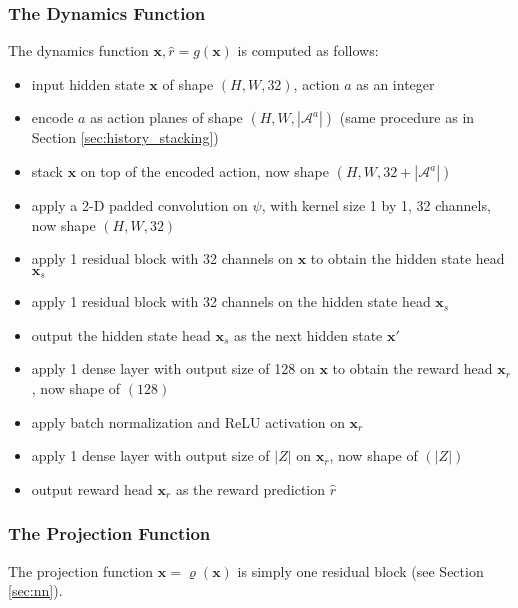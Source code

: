 \subsubsection{The Dynamics Function}
The dynamics function $\mathbf{x}, \hat{r} = g(\mathbf{x})$ is computed as follows:
\begin{itemize}
    \item input hidden state $\mathbf{x}$ of shape $(H, W, 32)$, action $a$ as an integer
    \item encode $a$ as action planes of shape $(H, W, |\mathcal{A}^a|)$ (same procedure as in Section \ref{sec:history_stacking})
    \item stack $\mathbf{x}$ on top of the encoded action, now shape $(H, W, 32 + |\mathcal{A}^a|)$

    \item apply a 2-D padded convolution on $\psi$, with kernel size 1 by 1, 32 channels, now shape $(H, W, 32)$
    \item apply 1 residual block with 32 channels on $\mathbf{x}$ to obtain the hidden state head $\mathbf{x}_s$
    \item apply 1 residual block with 32 channels on the hidden state head $\mathbf{x}_s$
    \item output the hidden state head $\mathbf{x}_s$ as the next hidden state $\mathbf{x}'$

    \item apply 1 dense layer with output size of 128 on $\mathbf{x}$ to obtain the reward head $\mathbf{x}_r$, now shape of $(128)$
    \item apply batch normalization and ReLU activation on $\mathbf{x}_r$
    \item apply 1 dense layer with output size of $|Z|$ on $\mathbf{x}_r$, now shape of $(|Z|)$
    \item output reward head $\mathbf{x}_r$ as the reward prediction $\hat{r}$
\end{itemize}

\subsubsection{The Projection Function}
The projection function $\mathbf{x} = \varrho(\mathbf{x})$ is simply one residual block (see Section \ref{sec:nn}).

